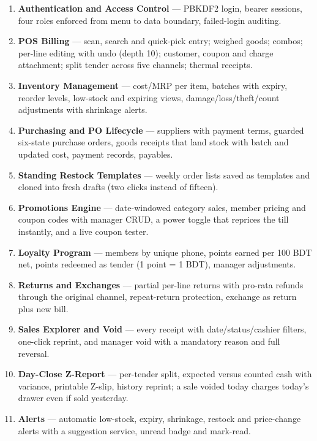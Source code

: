 \documentclass[12pt,a4paper]{report}
\begin{document}
\begin{enumerate}
  \item \textbf{Authentication and Access Control} --- PBKDF2 login, bearer sessions,
        four roles enforced from menu to data boundary, failed-login auditing.
  \item \textbf{POS Billing} --- scan, search and quick-pick entry; weighed goods;
        combos; per-line editing with undo (depth 10); customer, coupon and charge
        attachment; split tender across five channels; thermal receipts.
  \item \textbf{Inventory Management} --- cost/MRP per item, batches with expiry,
        reorder levels, low-stock and expiring views, damage/loss/theft/count
        adjustments with shrinkage alerts.
  \item \textbf{Purchasing and PO Lifecycle} --- suppliers with payment terms, guarded
        six-state purchase orders, goods receipts that land stock with batch and updated
        cost, payment records, payables.
  \item \textbf{Standing Restock Templates} --- weekly order lists saved as templates
        and cloned into fresh drafts (two clicks instead of fifteen).
  \item \textbf{Promotions Engine} --- date-windowed category sales, member pricing and
        coupon codes with manager CRUD, a power toggle that reprices the till instantly,
        and a live coupon tester.
  \item \textbf{Loyalty Program} --- members by unique phone, points earned per 100 BDT
        net, points redeemed as tender (1 point = 1 BDT), manager adjustments.
  \item \textbf{Returns and Exchanges} --- partial per-line returns with pro-rata refunds
        through the original channel, repeat-return protection, exchange as return plus
        new bill.
  \item \textbf{Sales Explorer and Void} --- every receipt with date/status/cashier
        filters, one-click reprint, and manager void with a mandatory reason and full
        reversal.
  \item \textbf{Day-Close Z-Report} --- per-tender split, expected versus counted cash
        with variance, printable Z-slip, history reprint; a sale voided today charges
        today's drawer even if sold yesterday.
  \item \textbf{Alerts} --- automatic low-stock, expiry, shrinkage, restock and
        price-change alerts with a suggestion service, unread badge and mark-read.

\end{enumerate}
\end{document}
